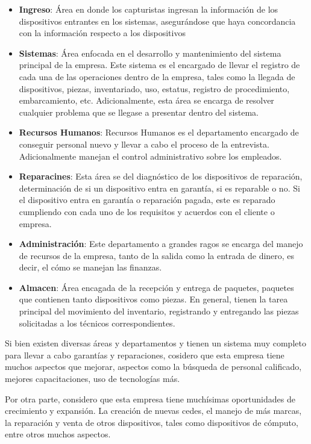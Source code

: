     \begin{itemize}
        \item \textbf{Ingreso}: Área en donde los capturistas ingresan la información de los
            dispositivos entrantes en los sistemas, asegurándose que haya concordancia con
            la información respecto a los dispositivos

        \item \textbf{Sistemas}: Área enfocada en el desarrollo y mantenimiento del sistema
            principal de la empresa. Este sistema es el encargado de llevar el registro de
            cada una de las operaciones dentro de la empresa, tales como la llegada de dispositivos,
            piezas, inventariado, uso, estatus, registro de procedimiento, embarcamiento,
            etc. Adicionalmente, esta área se encarga de resolver cualquier problema que
            se llegase a presentar dentro del sistema.

        \item \textbf{Recursos Humanos}: Recursos Humanos es el departamento encargado de conseguir
            personal nuevo y llevar a cabo el proceso de la entrevista. Adicionalmente
            manejan el control administrativo sobre los empleados.

        \item \textbf{Reparacines}: Esta área se del diagnóstico de los dispositivos de reparación,
            determinación de si un dispositivo entra en garantía, si es reparable o no. Si
            el dispositivo entra en garantía o reparación pagada, este es reparado cumpliendo
            con cada uno de los requisitos y acuerdos con el cliente o empresa.

        \item \textbf{Administración}: Este departamento a grandes ragos se encarga del manejo
            de recursos de la empresa, tanto de la salida como la entrada de dinero, es decir,
            el cómo se manejan las finanzas.

        \item \textbf{Almacen}: Área encagada de la recepción y entrega de paquetes,
            paquetes que contienen tanto dispositivos como piezas. En general, tienen la
            tarea principal del movimiento del inventario, registrando y entregando las piezas
            solicitadas a los técnicos correspondientes.
    \end{itemize}

    Si bien existen diversas áreas y departamentos y tienen un sistema muy completo para llevar
    a cabo garantías y reparaciones, cosidero que esta empresa tiene muchos aspectos que
    mejorar, aspectos como la búsqueda de personal calificado, mejores capacitaciones, uso
    de tecnologías más.

    Por otra parte, considero que esta empresa tiene muchísimas oportunidades de
    crecimiento y expansión. La creación de nuevas cedes, el manejo de más marcas, la reparación
    y venta de otros dispositivos, tales como dispositivos de cómputo, entre otros muchos aspectos.
